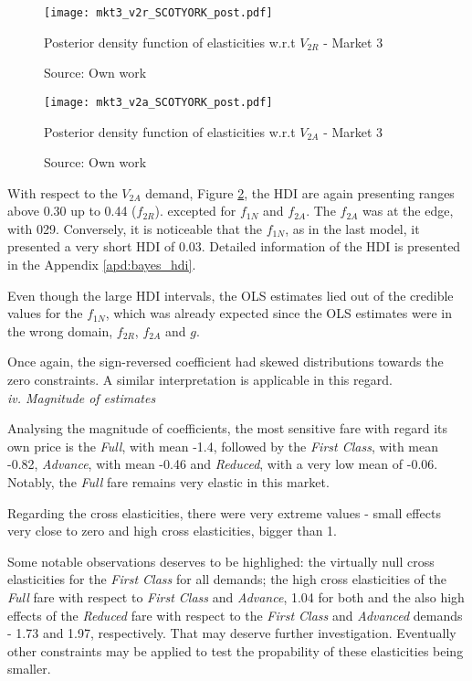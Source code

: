 \begin{figure}[H]
\centering
\texttt{[image: mkt3\_v2r\_SCOTYORK\_post.pdf]}
\caption{Posterior density function of elasticities w.r.t $V_{2R}$ - Market 3}
\label{fig:mkt3_v2r_SCOTYORK_post}
\caption*{Source: Own work}
\end{figure} 

\begin{figure}[H]
\centering
\texttt{[image: mkt3\_v2a\_SCOTYORK\_post.pdf]}
\caption{Posterior density function of elasticities w.r.t $V_{2A}$ - Market 3}
\label{fig:mkt3_v2a_SCOTYORK_post}
\caption*{Source: Own work}
\end{figure} 

With respect to the $V_{2A}$ demand, Figure \ref{fig:mkt3_v2a_SCOTYORK_post}, the HDI are again presenting ranges above 0.30 up to 0.44 ($f_{2R}$). excepted for $f_{1N}$ and $f_{2A}$. The $f_{2A}$ was at the edge, with 029. Conversely, it is noticeable that the $f_{1N}$, as in the last model, it presented a very short HDI of 0.03. Detailed information of the HDI is presented in the Appendix \ref{apd:bayes_hdi}. 

Even though the large HDI intervals, the OLS estimates lied out of the credible values for the $f_{1N}$, which was already expected since the OLS estimates were in the wrong domain, $f_{2R}$, $f_{2A}$ and $g$. 

Once again, the sign-reversed coefficient had skewed distributions towards the zero constraints. A similar interpretation is applicable in this regard.
\\[3pt]

\textit{iv. Magnitude of estimates}

Analysing the magnitude of coefficients, the most sensitive fare with regard its own price is the \textit{Full}, with mean -1.4, followed by the \textit{First Class}, with mean -0.82, \textit{Advance}, with mean -0.46 and \textit{Reduced}, with a very low mean of -0.06. Notably, the \textit{Full} fare remains very elastic in this market.

Regarding the cross elasticities, there were very extreme values - small effects very close to zero and high cross elasticities, bigger than 1. 

Some notable observations deserves to be highlighed: the virtually null cross elasticities for the \textit{First Class} for all demands; the high cross elasticities of the \textit{Full} fare with respect to \textit{First Class} and \textit{Advance}, 1.04 for both and the also high effects of the \textit{Reduced} fare with respect to the \textit{First Class} and \textit{Advanced} demands - 1.73 and 1.97, respectively. That may deserve further investigation. Eventually other constraints may be applied to test the propability of these elasticities being smaller.

